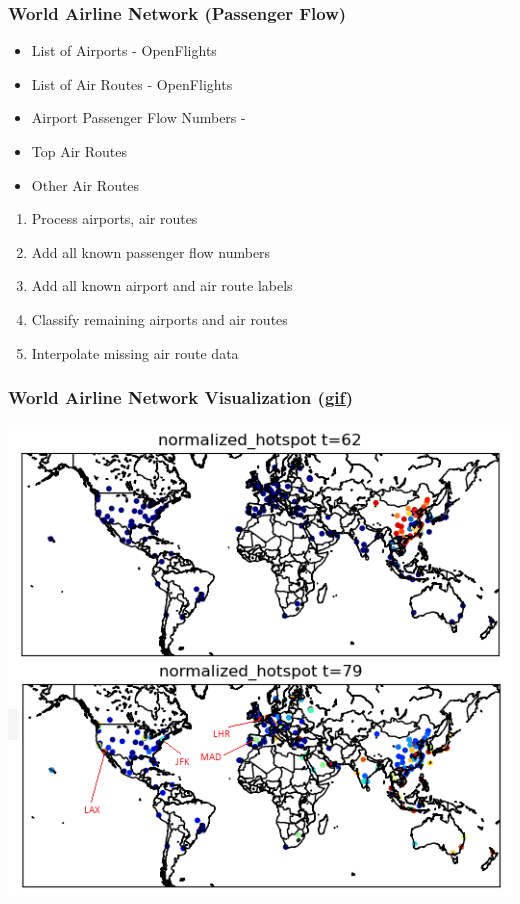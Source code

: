\documentclass{beamer}
\begin{document}
\begin{frame}
\frametitle{World Airline Network (Passenger Flow)}
\begin{itemize}
    \item List of Airports - OpenFlights \cite{openflights}
    \item List of Air Routes - OpenFlights \cite{openflights}
    \item Airport Passenger Flow Numbers - \cite{airport_traffic}
    \item Top Air Routes \cite{airport_pairs}
    \item Other Air Routes
\end{itemize}
\begin{enumerate}
    \item Process airports, air routes
    \item Add all known passenger flow numbers
	\item Add all known airport and air route labels
	\item Classify remaining airports and air routes
	\item Interpolate missing air route data 
\end{enumerate}
\end{frame}
\begin{frame}[shrink=5]
\frametitle{World Airline Network Visualization (\href{https://github.com/cheung-ho-lum/NS_Epidemics_ABM_Approach/blob/master/Repository/Visualizations/infection_timelapse_world.gif}{gif})}
\includegraphics[width=1.0\textwidth]{Scratch_Visuals/covid_airlines.png}
\end{frame}
\end{document}
